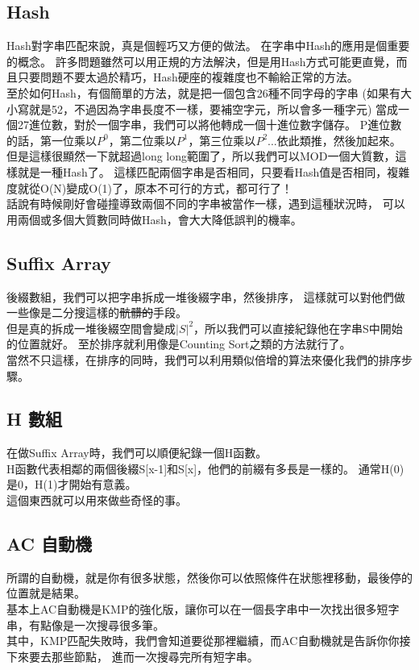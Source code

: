 \documentclass{article}
\begin{document}
\subsection{Hash}
Hash對字串匹配來說，真是個輕巧又方便的做法。
在字串中Hash的應用是個重要的概念。
許多問題雖然可以用正規的方法解決，但是用Hash方式可能更直覺，而且只要問題不要太過於精巧，Hash硬座的複雜度也不輸給正常的方法。\\
至於如何Hash，有個簡單的方法，就是把一個包含26種不同字母的字串
(如果有大小寫就是52，不過因為字串長度不一樣，要補空字元，所以會多一種字元)
當成一個27進位數，對於一個字串，我們可以將他轉成一個十進位數字儲存。
P進位數的話，第一位乘以$P^0$，第二位乘以$P^1$，第三位乘以$P^2$...依此類推，然後加起來。
但是這樣很顯然一下就超過long long範圍了，所以我們可以MOD一個大質數，這樣就是一種Hash了。
這樣匹配兩個字串是否相同，只要看Hash值是否相同，複雜度就從O(N)變成O(1)了，原本不可行的方式，都可行了！\\
話說有時候剛好會碰撞導致兩個不同的字串被當作一樣，遇到這種狀況時，
可以用兩個或多個大質數同時做Hash，會大大降低誤判的機率。

\subsection{Suffix Array}
後綴數組，我們可以把字串拆成一堆後綴字串，然後排序，
這樣就可以對他們做一些像是二分搜這樣的\sout{骯髒的}手段。\\
但是真的拆成一堆後綴空間會變成$|S|^2$，所以我們可以直接紀錄他在字串S中開始的位置就好。
至於排序就利用像是Counting Sort之類的方法就行了。\\
當然不只這樣，在排序的同時，我們可以利用類似倍增的算法來優化我們的排序步驟。

\subsection{H 數組}
在做Suffix Array時，我們可以順便紀錄一個H函數。\\
H函數代表相鄰的兩個後綴S[x-1]和S[x]，他們的前綴有多長是一樣的。
通常H(0)是0，H(1)才開始有意義。\\
這個東西就可以用來做些奇怪的事。

\subsection{AC 自動機}
所謂的自動機，就是你有很多狀態，然後你可以依照條件在狀態裡移動，最後停的位置就是結果。\\
基本上AC自動機是KMP的強化版，讓你可以在一個長字串中一次找出很多短字串，有點像是一次搜尋很多筆。\\
其中，KMP匹配失敗時，我們會知道要從那裡繼續，而AC自動機就是告訴你你接下來要去那些節點，
進而一次搜尋完所有短字串。
\end{document}
